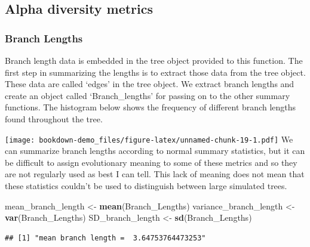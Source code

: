 \documentclass[]{book}
\newenvironment{Shaded}{\begin{snugshade}}{\end{snugshade}}
\newcommand{\KeywordTok}[1]{\textcolor[rgb]{0.13,0.29,0.53}{\textbf{{#1}}}}
\newcommand{\StringTok}[1]{\textcolor[rgb]{0.31,0.60,0.02}{{#1}}}
\newcommand{\OperatorTok}[1]{\textcolor[rgb]{0.81,0.36,0.00}{\textbf{{#1}}}}
\newcommand{\NormalTok}[1]{{#1}}
\theoremstyle{definition}
\theoremstyle{definition}
\theoremstyle{definition}
\theoremstyle{remark}
\begin{document}
\hypertarget{alpha-diversity-metrics}{\subsection{Alpha diversity
metrics}\label{alpha-diversity-metrics}}

\hypertarget{branch-lengths}{\subsubsection{Branch
Lengths}\label{branch-lengths}}

Branch length data is embedded in the tree object provided to this
function. The first step in summarizing the lengths is to extract those
data from the tree object. These data are called `edges' in the tree
object. We extract branch lengths and create an object called
`Branch\_lengths' for passing on to the other summary functions. The
histogram below shows the frequency of different branch lengths found
throughout the tree.

\begin{Shaded}
\end{Shaded}

\texttt{[image: bookdown-demo\_files/figure-latex/unnamed-chunk-19-1.pdf]}
We can summarize branch lengths according to normal summary statistics,
but it can be difficult to assign evolutionary meaning to some of these
metrics and so they are not regularly used as best I can tell. This lack
of meaning does not mean that these statistics couldn't be used to
distinguish between large simulated trees.

\begin{Shaded}
\begin{Highlighting}[]
\NormalTok{mean_branch_length <-}\StringTok{ }\KeywordTok{mean}\NormalTok{(Branch_Lengths)}
\NormalTok{variance_branch_length <-}\StringTok{ }\KeywordTok{var}\NormalTok{(Branch_Lengths)}
\NormalTok{SD_branch_length <-}\StringTok{ }\KeywordTok{sd}\NormalTok{(Branch_Lengths)}
\end{Highlighting}
\end{Shaded}

\begin{verbatim}
## [1] "mean branch length =  3.64753764473253"
\end{verbatim}
\end{document}
